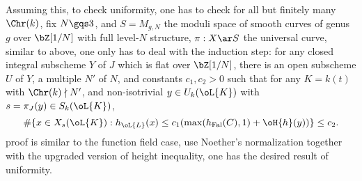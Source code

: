 \documentclass[article, a4paper, twoside]{universal}
\begin{document}
Assuming this, to check uniformity, one has to check for all but finitely many $\Chr(k)$, fix $N\gqs3$, and $S=M_{g,N}$ the moduli space of smooth curves of genus $g$ over $\bZ[1/N]$ with full level-$N$ structure, $\pi:X\ar S$ the universal curve, similar to above, one only has to deal with the induction step: for any closed integral subscheme $Y$ of $J$ which is flat over $\bZ[1/N]$, there is an open subscheme $U$ of $Y$, a multiple $N'$ of $N$, and constants $c_{1},c_{2}>0$ such that for any $K=k(t)$ with $\Chr(k)\nmid N'$, and non-isotrivial $y\in U_{k}(\oL{K})$ with $s=\pi_{J}(y)\in S_{k}(\oL{K})$,
\[
	\#\{x\in X_{s}(\oL{K}):h_{\oL{L}}(x)\leq c_{1}(\max(h_{\mathrm{Fal}}(C),1)+\oH{h}(y))\}\leq c_{2}.
\]
proof is similar to the function field case, use Noether's normalization together with the upgraded version of height inequality, one has the desired result of uniformity.




\printref
\end{document}
